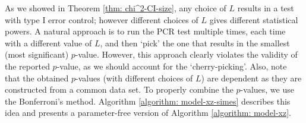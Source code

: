 \documentclass[11pt]{article}
\begin{document}
As we showed in Theorem \ref{thm: chi^2-CI-size}, any choice of $L$ results in a test with type I error control; however different choices of $L$ gives different statistical powers. %
A natural approach is to run the PCR test multiple times, each time with a different value of $L$, and then `pick' the one that results in the smallest (most significant) $p$-value. However, this approach clearly violates the validity of the reported $p$-value, as we should account for the `cherry-picking'. Also, note that the obtained $p$-values (with different choices of $L$) are dependent as they are constructed from a common data set. To properly combine the $p$-values, we use the Bonferroni's method. Algorithm \ref{algorithm: model-xz-simes} describes this idea and presents a parameter-free version of Algorithm \ref{algorithm: model-xz}. 
\end{document}
